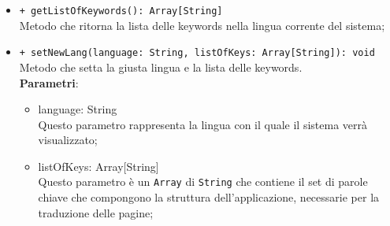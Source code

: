 \begin{itemize}
\begin{itemize}
				\item \texttt{+ getListOfKeywords(): Array[String]} \\
				Metodo che ritorna la lista delle keywords nella lingua corrente del sistema;
				
				\item \texttt{+ setNewLang(language: String, listOfKeys: Array[String]): void} \\
				Metodo che setta la giusta lingua e la lista delle keywords.\\
				\textbf{Parametri}:
				\begin{itemize}
					\item {language: String}\\
					Questo parametro rappresenta la lingua con il quale il sistema verrà visualizzato;
					\item {listOfKeys: Array[String]}\\
					Questo parametro è un \texttt{Array} di \texttt{String} che contiene il set di parole chiave che compongono la struttura dell'applicazione, necessarie per la traduzione delle pagine; 
				\end{itemize}
				
			\end{itemize}
		\end{itemize}
		
		
